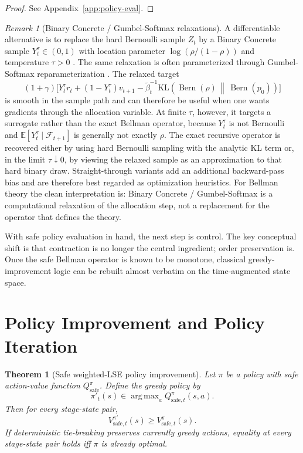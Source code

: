 \documentclass{article}
\newtheorem{theorem}{Theorem}[section]
\theoremstyle{remark}
\newtheorem{remark}[remark]{Remark}
\DeclareMathOperator*{\argmax}{arg\,max}
\DeclareMathOperator{\Bern}{Bern}
\newcommand{\E}{\mathbb{E}}
\newcommand{\KL}{\mathrm{KL}}
\newcommand{\pprior}{p_0}
\newcommand{\KLbin}[2]{\KL\!\left(\Bern(#1)\,\middle\|\,\Bern(#2)\right)}
\newcommand{\safe}{\mathrm{safe}}
\begin{document}
\begin{proof}
See Appendix~\ref{app:policy-eval}.
\end{proof}

\begin{remark}[Binary Concrete / Gumbel-Softmax relaxations]
\label{rem:gumbel-relaxation}
A differentiable alternative is to replace the hard Bernoulli sample $Z_t$ by a Binary Concrete sample $Y_t^\tau\in(0,1)$ with location parameter $\log(\rho/(1-\rho))$ and temperature $\tau>0$ \citep{maddison2017concrete}. The same relaxation is often parameterized through Gumbel-Softmax reparameterization \citep{jang2017categorical}.
The relaxed target
\[
(1+\gamma)\bigl[Y_t^\tau r_t +(1-Y_t^\tau)v_{t+1} - \widetilde\beta_t^{-1}\KLbin{\rho}{\pprior}\bigr]
\]
is smooth in the sample path and can therefore be useful when one wants gradients through the allocation variable.
At finite $\tau$, however, it targets a surrogate rather than the exact Bellman operator, because $Y_t^\tau$ is not Bernoulli and $\E[Y_t^\tau\mid \mathcal F_{t+1}]$ is generally not exactly $\rho$.
The exact recursive operator is recovered either by using hard Bernoulli sampling with the analytic KL term or, in the limit $\tau\downarrow 0$, by viewing the relaxed sample as an approximation to that hard binary draw.
Straight-through variants add an additional backward-pass bias and are therefore best regarded as optimization heuristics.
For Bellman theory the clean interpretation is: Binary Concrete / Gumbel-Softmax is a computational relaxation of the allocation step, not a replacement for the operator that defines the theory.
\end{remark}

With safe policy evaluation in hand, the next step is control.
The key conceptual shift is that contraction is no longer the central ingredient; order preservation is.
Once the safe Bellman operator is known to be monotone, classical greedy-improvement logic can be rebuilt almost verbatim on the time-augmented state space.

\section{Policy Improvement and Policy Iteration}
\label{sec:policy-iteration}

\begin{theorem}[Safe weighted-LSE policy improvement]
\label{thm:policy-improvement}
Let $\pi$ be a policy with safe action-value function $Q_\safe^\pi$.
Define the greedy policy by
\[
\pi'_t(s)\in\argmax_a Q_{\safe,t}^\pi(s,a).
\]
Then for every stage-state pair,
\begin{equation}
V_{\safe,t}^{\pi'}(s)\ge V_{\safe,t}^{\pi}(s).
\label{eq:safe-policy-improvement}
\end{equation}
If deterministic tie-breaking preserves currently greedy actions, equality at every stage-state pair holds iff $\pi$ is already optimal.
\end{theorem}
\end{document}
